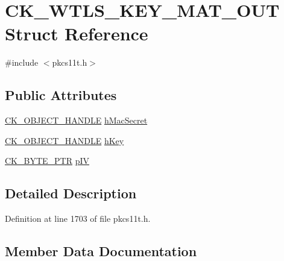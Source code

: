 \hypertarget{struct_c_k___w_t_l_s___k_e_y___m_a_t___o_u_t}{}\section{C\+K\+\_\+\+W\+T\+L\+S\+\_\+\+K\+E\+Y\+\_\+\+M\+A\+T\+\_\+\+O\+UT Struct Reference}
\label{struct_c_k___w_t_l_s___k_e_y___m_a_t___o_u_t}


{\ttfamily \#include $<$pkcs11t.\+h$>$}

\subsection*{Public Attributes}
\begin{DoxyCompactItemize}
\item 
\hyperlink{pkcs11t_8h_ad1cdd703196214cd34e6f9f52bc67683}{C\+K\+\_\+\+O\+B\+J\+E\+C\+T\+\_\+\+H\+A\+N\+D\+LE} \hyperlink{struct_c_k___w_t_l_s___k_e_y___m_a_t___o_u_t_a00658d76a389d170699973832566b3a3}{h\+Mac\+Secret}
\item 
\hyperlink{pkcs11t_8h_ad1cdd703196214cd34e6f9f52bc67683}{C\+K\+\_\+\+O\+B\+J\+E\+C\+T\+\_\+\+H\+A\+N\+D\+LE} \hyperlink{struct_c_k___w_t_l_s___k_e_y___m_a_t___o_u_t_a75c3f25b467dc7d7d914e858becf5251}{h\+Key}
\item 
\hyperlink{pkcs11t_8h_a3d7233a4077fbaf7ae76b64da0a62a21}{C\+K\+\_\+\+B\+Y\+T\+E\+\_\+\+P\+TR} \hyperlink{struct_c_k___w_t_l_s___k_e_y___m_a_t___o_u_t_a3bd65cceda3c251a13277ac4aef20d07}{p\+IV}
\end{DoxyCompactItemize}


\subsection{Detailed Description}


Definition at line 1703 of file pkcs11t.\+h.



\subsection{Member Data Documentation}
\mbox{\label{struct_c_k___w_t_l_s___k_e_y___m_a_t___o_u_t_a75c3f25b467dc7d7d914e858becf5251}} 

